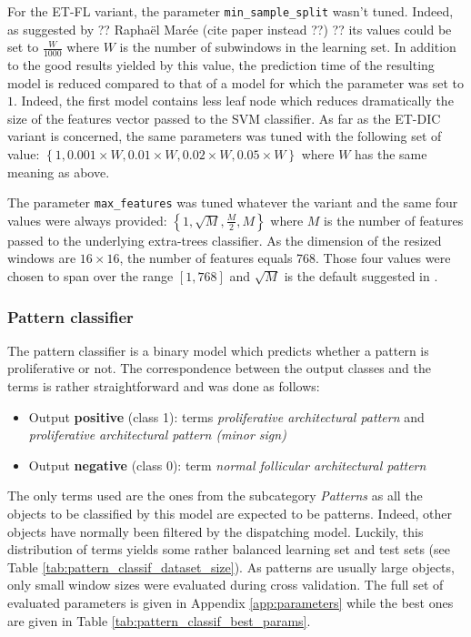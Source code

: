 For the ET-FL variant, the parameter \texttt{min\_sample\_split} wasn't tuned. Indeed, as suggested by ?? Raphaël Marée (cite paper instead ??) ?? its values could be set to $\frac{W}{1000}$ where $W$ is the number of subwindows in the learning set. In addition to the good results yielded by this value, the prediction time of the resulting model is reduced compared to that of a model for which the parameter was set to $1$. Indeed, the first model contains less leaf node which reduces dramatically the size of the features vector passed to the SVM classifier. As far as the ET-DIC variant is concerned, the same parameters was tuned with the following set of value: $\left\{1, 0.001 \times W, 0.01 \times W, 0.02 \times W, 0.05 \times W \right\}$ where $W$ has the same meaning as above.

The parameter \texttt{max\_features} was tuned whatever the variant and the same four values were always provided: $\left\{1, \sqrt{M}, \frac{M}{2}, M\right\}$ where $M$ is the number of features passed to the underlying extra-trees classifier. As the dimension of the resized windows are $16\times 16$, the number of features equals 768. Those four values were chosen to span over the range $[1, 768]$ and $\sqrt{M}$ is the default suggested in \cite{Geurts2006}. 

\subsubsection{Pattern classifier}
\label{sssec:thyroid_pattern_model}
The pattern classifier is a binary model which predicts whether a pattern is proliferative or not. The correspondence between the output classes and the terms is rather straightforward and was done as follows:

\begin{itemize}
	\item Output \textbf{positive} (class 1): terms \textit{proliferative architectural pattern} and \textit{proliferative architectural pattern (minor sign)}
	\item Output \textbf{negative} (class 0): term \textit{normal follicular architectural pattern}
\end{itemize}

The only terms used are the ones from the subcategory \textit{Patterns} as all the objects to be classified by this model are expected to be patterns.  Indeed, other objects have normally been filtered by the dispatching model. Luckily, this distribution of terms yields some rather balanced learning set and test sets (see Table \ref{tab:pattern_classif_dataset_size}). As patterns are usually large objects, only small window sizes were evaluated during cross validation. The full set of evaluated parameters is given in Appendix \ref{app:parameters} while the best ones are given in Table \ref{tab:pattern_classif_best_params}. 


